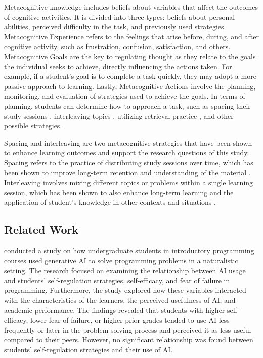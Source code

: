 \documentclass[a4paper,twoside]{article}
\begin{document}
Metacognitive knowledge includes beliefs about variables that affect the
outcomes of cognitive activities. It is divided into three types: beliefs about
personal abilities, perceived difficulty in the task, and previously used
strategies. Metacognitive Experience refers to the feelings that arise before,
during, and after cognitive activity, such as frustration, confusion,
satisfaction, and others. Metacognitive Goals are the key to regulating thought
as they relate to the goals the individual seeks to achieve, directly
influencing the actions taken. For example, if a student’s goal is to complete
a task quickly, they may adopt a more passive approach to learning. Lastly,
Metacognitive Actions involve the planning, monitoring, and evaluation of
strategies used to achieve the goals. In terms of planning, students can
determine how to approach a task, such as spacing their study sessions
\citep{Carvalho20}, interleaving topics \citep{Rivers21}, utilizing
retrieval practice \citep{larsen18}, and other possible strategies.

Spacing and interleaving are two metacognitive strategies that have been shown
to enhance learning outcomes and support the research questions of this study.
Spacing refers to the practice of distributing study sessions over time, which
has been shown to improve long-term retention and understanding of the material
\citep{Carvalho20}. Interleaving involves mixing different topics or problems
within a single learning session, which has been shown to also enhance long-term
learning and the application of student's knowledge in other contexts and
situations \citep{Rivers21} .

\subsection{Related Work}

\cite{Margulieux24} conducted a study on how undergraduate students in
introductory programming courses used generative AI to solve programming
problems in a naturalistic setting. The research focused on examining the
relationship between AI usage and students’ self-regulation strategies,
self-efficacy, and fear of failure in programming. Furthermore, the study
explored how these variables interacted with the characteristics of the learners,
the perceived usefulness of AI, and academic performance. The findings revealed
that students with higher self-efficacy, lower fear of failure, or higher prior
grades tended to use AI less frequently or later in the problem-solving process
and perceived it as less useful compared to their peers. However, no significant
relationship was found between students’ self-regulation strategies and their
use of AI.
\end{document}
